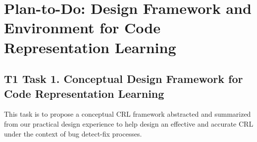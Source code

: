 
\section{Plan-to-Do: Design Framework and Environment for Code Representation Learning}
\label{thrust2:sec}

\subsection{T1 Task 1. Conceptual Design Framework for Code Representation Learning}
This task is to propose a conceptual CRL framework abstracted and
summarized from our practical design experience to help design an
effective and accurate CRL under the context of bug detect-fix
processes.


